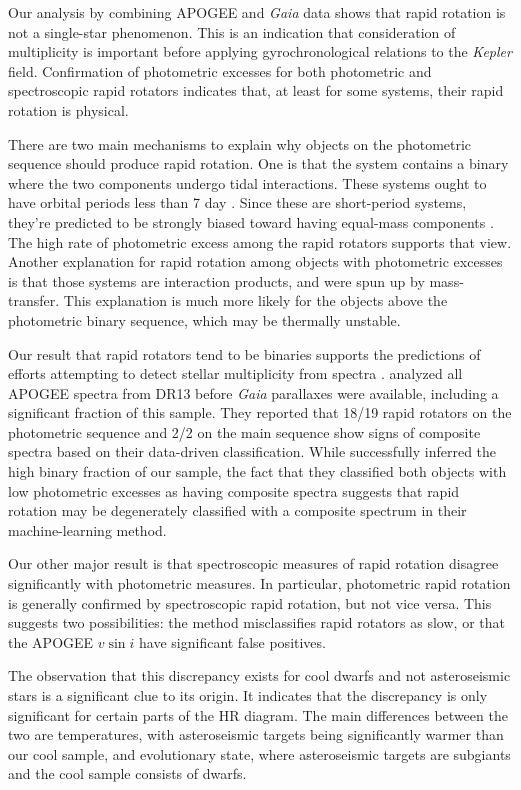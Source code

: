 \documentclass[manuscript]{aastex6}
\newcommand{\vsini}{\ensuremath{v \sin i}}
\newcommand{\Kepler}{\mbox{\textit{Kepler}}}
\newcommand{\Gaia}{\mbox{\textit{Gaia}}}
\begin{document}
Our analysis by combining APOGEE and \Gaia{} data shows that rapid
rotation is not a single-star phenomenon. This is an indication that
consideration of multiplicity is important before applying gyrochronological
relations to the \Kepler{} field. Confirmation of photometric excesses for 
both photometric and spectroscopic rapid rotators indicates that, at least
for some systems, their rapid rotation is physical.

There are two main mechanisms to explain why objects on the photometric
sequence should produce rapid rotation. One is that the system contains
a binary where the two components undergo tidal interactions. These
systems ought to have orbital periods less than 7 day
\citep{Raghavan10}. Since these are short-period systems, they're predicted 
to be strongly biased toward having equal-mass components
\citep{Bate02}. The high rate of photometric excess among the rapid
rotators supports that view. Another explanation for rapid rotation
among objects with photometric excesses is that those systems are
interaction products, and were spun up by mass-transfer. This
explanation is much more likely for the objects above the photometric
binary sequence, which may be thermally unstable.

Our result that rapid rotators tend to be binaries supports the
predictions of efforts attempting to detect stellar multiplicity from
spectra \citep{ElBadry18}. \citet{ElBadry18} analyzed all APOGEE spectra
from DR13 before \Gaia{} parallaxes were available, including a
significant fraction of this sample. They
reported that 18/19 rapid rotators on the photometric sequence and 2/2 on 
the main sequence show signs of composite spectra based on their
data-driven classification. While \citet{ElBadry18} successfully inferred the
high binary fraction of our sample, the fact that they classified both objects
with low photometric excesses as having composite spectra suggests that 
rapid rotation may be degenerately classified with a composite spectrum
in their machine-learning method.

Our other major result is that spectroscopic measures of rapid rotation 
disagree significantly with photometric measures. In particular,
photometric rapid rotation is generally confirmed by spectroscopic rapid
rotation, but not vice versa. This suggests two
possibilities: the \citet{McQuillan14} method misclassifies rapid
rotators as slow, or that the APOGEE \vsini{} have significant false
positives.

The observation that this discrepancy exists for cool dwarfs and not
asteroseismic stars is a significant clue to its origin. It indicates 
that the discrepancy is only significant for certain parts of the HR diagram. 
The main differences between the two are temperatures, with asteroseismic 
targets being significantly warmer than our cool sample, and evolutionary 
state, where asteroseismic targets are subgiants and the cool sample consists 
of dwarfs.
\end{document}
